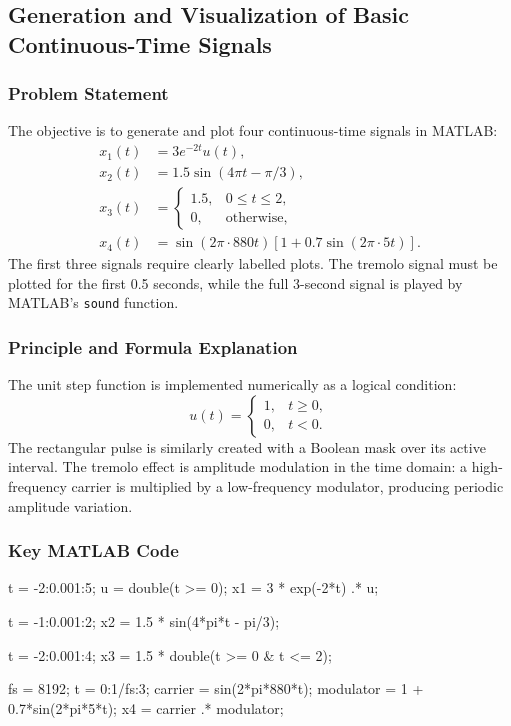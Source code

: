 \documentclass[11pt,a4paper]{article}
\begin{document}
\subsection{Generation and Visualization of Basic Continuous-Time Signals}

\subsubsection{Problem Statement}
The objective is to generate and plot four continuous-time signals in MATLAB:
\begin{align}
x_1(t)&=3e^{-2t}u(t),\\
x_2(t)&=1.5\sin(4\pi t-\pi/3),\\
x_3(t)&=
\begin{cases}
1.5, & 0\leq t\leq 2,\\
0, & \text{otherwise},
\end{cases}\\
x_4(t)&=\sin(2\pi\cdot 880t)\left[1+0.7\sin(2\pi\cdot 5t)\right].
\end{align}
The first three signals require clearly labelled plots. The tremolo signal must be plotted for the first 0.5 seconds, while the full 3-second signal is played by MATLAB's \texttt{sound} function.

\subsubsection{Principle and Formula Explanation}
The unit step function is implemented numerically as a logical condition:
\[
u(t)=
\begin{cases}
1, & t\geq 0,\\
0, & t<0.
\end{cases}
\]
The rectangular pulse is similarly created with a Boolean mask over its active interval. The tremolo effect is amplitude modulation in the time domain: a high-frequency carrier is multiplied by a low-frequency modulator, producing periodic amplitude variation.

\subsubsection{Key MATLAB Code}
\begin{matlabcode}
t = -2:0.001:5;
u = double(t >= 0);
x1 = 3 * exp(-2*t) .* u;

t = -1:0.001:2;
x2 = 1.5 * sin(4*pi*t - pi/3);

t = -2:0.001:4;
x3 = 1.5 * double(t >= 0 & t <= 2);

fs = 8192;
t = 0:1/fs:3;
carrier = sin(2*pi*880*t);
modulator = 1 + 0.7*sin(2*pi*5*t);
x4 = carrier .* modulator;
\end{matlabcode}
\end{document}
